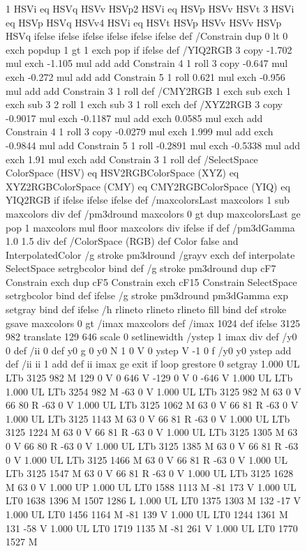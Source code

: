\documentclass{LMCS}
\begin{document}
\begin{figure}[!tbp]
{{{{{	 {1 HSVi eq {HSVq HSVv HSVp}{2 HSVi eq {HSVp HSVv HSVt}
	 {3 HSVi eq {HSVp HSVq HSVv}{4 HSVi eq {HSVt HSVp HSVv}
	 {HSVv HSVp HSVq} ifelse} ifelse} ifelse} ifelse} ifelse
  } ifelse} def
/Constrain {
  dup 0 lt {0 exch pop}{dup 1 gt {1 exch pop} if} ifelse} def
/YIQ2RGB {
  3 copy -1.702 mul exch -1.105 mul add add Constrain 4 1 roll
  3 copy -0.647 mul exch -0.272 mul add add Constrain 5 1 roll
  0.621 mul exch -0.956 mul add add Constrain 3 1 roll } def
/CMY2RGB {  1 exch sub exch 1 exch sub 3 2 roll 1 exch sub 3 1 roll exch } def
/XYZ2RGB {  3 copy -0.9017 mul exch -0.1187 mul add exch 0.0585 mul exch add
  Constrain 4 1 roll 3 copy -0.0279 mul exch 1.999 mul add exch
  -0.9844 mul add Constrain 5 1 roll -0.2891 mul exch -0.5338 mul add
  exch 1.91 mul exch add Constrain 3 1 roll} def
/SelectSpace {ColorSpace (HSV) eq {HSV2RGB}{ColorSpace (XYZ) eq {
  XYZ2RGB}{ColorSpace (CMY) eq {CMY2RGB}{ColorSpace (YIQ) eq {YIQ2RGB}
  if} ifelse} ifelse} ifelse} def
/maxcolorsLast {maxcolors 1 sub maxcolors div} def
/pm3dround {maxcolors 0 gt {dup maxcolorsLast ge {pop 1}
{maxcolors mul floor maxcolors div} ifelse} if} def
/pm3dGamma 1.0 1.5 div def
/ColorSpace (RGB) def
Color false and { InterpolatedColor { /g {stroke pm3dround /grayv exch def interpolate
        SelectSpace setrgbcolor} bind def
  }{
  /g {stroke pm3dround dup cF7 Constrain exch dup cF5 Constrain exch cF15 Constrain 
       SelectSpace setrgbcolor} bind def
  } ifelse
}{
  /g {stroke pm3dround pm3dGamma exp setgray} bind def
} ifelse
/h {rlineto rlineto rlineto fill} bind def
stroke gsave	maxcolors 0 gt {/imax maxcolors def} {/imax 1024 def} ifelse
3125 982 translate 129 646 scale 0 setlinewidth
/ystep 1 imax div def /y0 0 def /ii 0 def
{ y0 g 0 y0 N 1 0 V 0 ystep V -1 0 f
/y0 y0 ystep add def /ii ii 1 add def
ii imax ge {exit} if } loop
grestore 0 setgray
1.000 UL
LTb
3125 982 M
129 0 V
0 646 V
-129 0 V
0 -646 V
1.000 UL
LTb
1.000 UL
LTb
3254 982 M
-63 0 V
1.000 UL
LTb
3125 982 M
63 0 V
66 80 R
-63 0 V
1.000 UL
LTb
3125 1062 M
63 0 V
66 81 R
-63 0 V
1.000 UL
LTb
3125 1143 M
63 0 V
66 81 R
-63 0 V
1.000 UL
LTb
3125 1224 M
63 0 V
66 81 R
-63 0 V
1.000 UL
LTb
3125 1305 M
63 0 V
66 80 R
-63 0 V
1.000 UL
LTb
3125 1385 M
63 0 V
66 81 R
-63 0 V
1.000 UL
LTb
3125 1466 M
63 0 V
66 81 R
-63 0 V
1.000 UL
LTb
3125 1547 M
63 0 V
66 81 R
-63 0 V
1.000 UL
LTb
3125 1628 M
63 0 V
1.000 UP
1.000 UL
LT0
1588 1113 M
-81 173 V
1.000 UL
LT0
1638 1396 M
1507 1286 L
1.000 UL
LT0
1375 1303 M
132 -17 V
1.000 UL
LT0
1456 1164 M
-81 139 V
1.000 UL
LT0
1244 1361 M
131 -58 V
1.000 UL
LT0
1719 1135 M
-81 261 V
1.000 UL
LT0
1770 1527 M
}}}
\end{figure}
\end{document}
